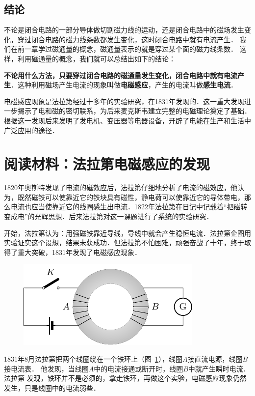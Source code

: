 \subsection*{结论}


不论是闭合电路的一部分导体做切割磁力线的运动，还是闭合电路中的磁场发生变化，穿过闭合电路的磁力线条数都发生变化，这时闭合电路中就有电流产生．
我们在前一章学过磁通量的概念，磁通量表示的就是穿过某个面的磁力线条数．
这样，利用磁通量的概念，我们就可以总结出如下的结论：

\textbf{不论用什么方法，只要穿过闭合电路的磁通量发生变化，闭合电路中就有电流产生}．这种利用磁场产生电流的现象叫做\textbf{电磁感应}，产生的电流叫做\textbf{感生电流}．

电磁感应现象是法拉第经过十多年的实验研究，在1831年发现的．这一重大发现进一步揭示了电和磁的密切联系，为后来麦克斯韦建立完整的电磁理论奠定了基础．
根据这一发现后来发明了发电机、变压器等电器设备，开辟了电能在生产和生活中广泛应用的途径．

\section*{阅读材料：法拉第电磁感应的发现}

1820年奥斯特发现了电流的磁效应后，法拉第仔细地分析了电流的磁效应，他认为，既然磁铁可以使靠近它的铁块具有磁性，静电荷可以使靠近它的导体带电，那么电流也应当使靠近它的线圈感生出电流．1822年法拉第在日记中记载着“把磁转变成电”的光辉思想．后来法拉第对这一课题进行了系统的实验研究．

开始，法拉第认为：用强磁铁靠近导线，导线中就会产生稳恒电流．法拉第企图用实验证实这个设想，结果未获成功．但法拉第不怕困难，顽强奋战了十年，终于取得了重大突破，1831年发现了电磁感应现象．
\begin{figure}[htbp]
    \centering
    \includegraphics{fig/C/2-4.pdf}
    \caption{}\label{fig_C_2-4}
\end{figure}

1831年8月法拉第把两个线圈绕在一个铁环上（图~\ref{fig_C_2-4}），线圈$A$接直流电源，线圈$B$接电流表．
他发现，当线圈$A$中的电流接通或断开时，线圈$B$中就产生瞬时电流．法拉第
发现，铁环并不是必须的，拿走铁环，再做这个实验，电磁感应现象仍然发生，只是线圈中的电流弱些．

